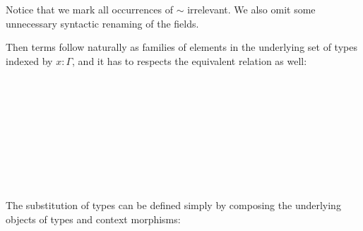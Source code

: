 Notice that we mark all occurrences of $\sim$ irrelevant. We also omit some unnecessary syntactic renaming of the fields.

Then terms follow naturally as families of elements in the underlying set of types indexed by $x : \Gamma$,  and it has to respects the equivalent relation as well:


\begin{code}\>\<%
\\
\>  \AgdaSymbol{\{} \AgdaSymbol{:} \AgdaSymbol{\}(} \AgdaSymbol{:}  \AgdaSymbol{)} \AgdaSymbol{:}  \<%
\\
\>[0]\<[2]%
\>[2] \<%
\\
\>[0]\<[2]%
\>[2]\<%
\\
\>[2]\<[4]%
\>[4] \<[10]%
\>[10]\AgdaSymbol{:} \AgdaSymbol{(} \AgdaSymbol{:}   \AgdaSymbol{)}   \AgdaFunction{[}  \AgdaFunction{]fm}  \<%
\\
\>[2]\<[4]%
\>[4] \AgdaSymbol{:}  \AgdaSymbol{\{}  \AgdaSymbol{:}   \AgdaSymbol{\}}  \<[31]%
\>[31]\<%
\\
\>[4]\<[10]%
\>[10]\AgdaSymbol{(} \AgdaSymbol{:} \AgdaFunction{[}  \AgdaFunction{]}   \AgdaSymbol{)}  \<[30]%
\>[30]\<%
\\
\>[4]\<[10]%
\>[10]\AgdaFunction{[} \AgdaFunction{[}  \AgdaFunction{]fm}  \AgdaFunction{]} \AgdaFunction{[}  \AgdaFunction{]subst}  \AgdaSymbol{(} \AgdaSymbol{)}   \<%
\\
\>\<\end{code}



The substitution of types can be defined simply by composing the underlying objects of types and context morphisms:


